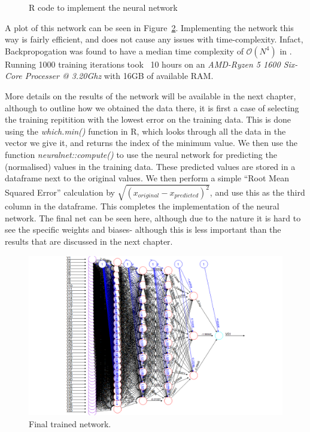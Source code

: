 \begin{figure}[h] %
    
    \caption{R code to implement the neural network}
    \label{nnRcode}
\end{figure}

A plot of this network can be seen in Figure~\ref{bestnet}. Implementing the network this way is fairly efficient, and does not cause any issues with time-complexity. Infact, Backpropogation 
was found to have a median time complexity of $\mathcal{O}(N^4)$ in \cite{lister}. Running 1000 training iterations took ~10 hours on an \textit{AMD-Ryzen 5 1600 Six-Core Processer @ 3.20Ghz} with 16GB of available RAM.

More details on the results of the network will be available in the next chapter, although to outline how we obtained the data there, it is first a case of selecting the training repitition 
with the lowest error on the training data. This is done using the \textit{which.min()} function in R, which looks through all the data in the vector we give it, and returns the index of the minimum value.
We then use the function \textit{neuralnet::compute()} to use the neural network for predicting the (normalised) values in the training data. These predicted values are stored in a dataframe next to the original values. 
We then perform a simple ``Root Mean Squared Error'' calculation by $\sqrt{(x_{original}-x_{predicted})^2}$, and use this as the third column in the dataframe. This completes the implementation of the neural network.
The final net can be seen here, although due to the nature it is hard to see the specific weights and biases- although this is less important than the results that are discussed in the next chapter. 



\begin{figure}[h] 
    \centering
    \includegraphics[width=0.9\linewidth]{figures/bestnet.png}
    \caption{Final trained network. }
    \label{bestnet}
\end{figure}